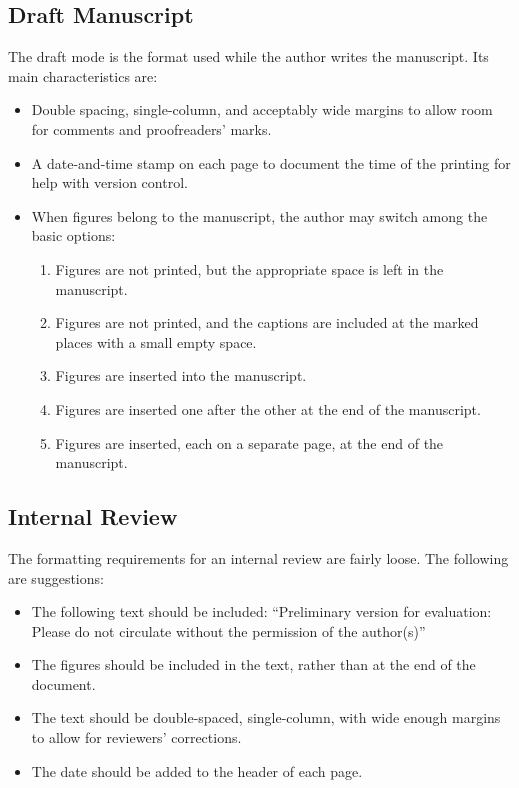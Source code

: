 \documentclass[%
	final,
	notitlepage,
	narroweqnarray,
	inline,
	twoside,
	]{ieee}
\begin{document}
\subsection{Draft Manuscript}

The draft mode is the format used while the author writes the manuscript. 
Its main characteristics are:
\begin{itemize}
\item Double spacing, single-column, and acceptably wide margins 
      to allow room for comments and proofreaders' marks.
\item A date-and-time stamp on each page to document the time of the
      printing for help with version control.
\item When figures belong to the manuscript, the author may switch
      among the basic options:
      \begin{enumerate}
      \item Figures are not printed, but the appropriate space is
            left in the manuscript.
      \item Figures are not printed, and the captions are
            included at the marked places with a small empty space.
      \item Figures are inserted into the manuscript.
      \item Figures are inserted one after the other at the end of the
            manuscript. 
      \item Figures are inserted, each on a separate page, at the end of the
            manuscript. 
      \end{enumerate}
\end{itemize}

\subsection{Internal Review}
The formatting requirements for an internal review are fairly loose.
The following are suggestions:
\begin{itemize}
\item The following text should be included:
      ``Preliminary version for evaluation: Please do not circulate 
      without the permission of the author(s)''
\item The figures should be included in the text, rather than at the
      end of the document. 
\item The text should be double-spaced, single-column, with wide enough 
      margins to allow for reviewers' corrections.
\item The date should be added to the header of each page. 
\end{itemize}
\end{document}
